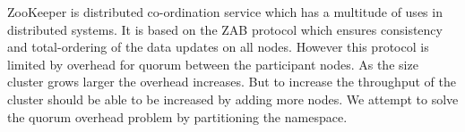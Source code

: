 \documentclass[11pt]{article}
\begin{document}
ZooKeeper is distributed co-ordination service which has a multitude of uses in distributed systems. It is based on the ZAB protocol which ensures consistency and total-ordering of the data updates on all nodes. However this protocol is limited by overhead for quorum between the participant nodes. As the size cluster grows larger the overhead increases. But to increase the throughput of the cluster should be able to be increased by adding more nodes. We attempt to solve the quorum overhead problem by partitioning the namespace.
\end{document}
